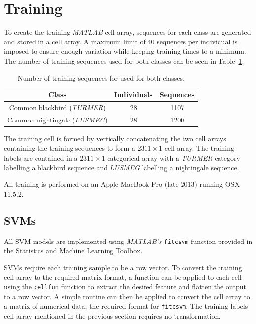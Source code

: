 \section{Training}\label{sec:training}

To create the training \textit{MATLAB} cell array, sequences for each class are
generated and stored in a cell array. A maximum limit of 40 sequences per
individual is imposed to ensure enough variation while keeping training times to
a minimum. The number of training sequences used for both classes can be seen in
Table~\ref{table:training_samples}.

\begin{table}[ht]
\begin{center}
\begin{tabular}{c c c}
\toprule
Class & Individuals & Sequences \\ [0.5ex]
\midrule
Common blackbird (\textit{TURMER}) & 28 & 1107 \\
Common nightingale (\textit{LUSMEG}) & 28 & 1200 \\
\bottomrule
\end{tabular}
\caption{Number of training sequences for used for both
classes.}\label{table:training_samples}
\end{center}
\end{table}

The training cell is formed by vertically concatenating the two cell arrays
containing the training sequences to form a $2311 \times 1$ cell array. The
training labels are contained in a $2311 \times 1$ categorical array with a
\textit{TURMER} category labelling a blackbird sequence and \textit{LUSMEG}
labelling a nightingale sequence.

All training is performed on an Apple MacBook Pro (late 2013) running OSX
11.5.2.

\subsection{SVMs}

All SVM models are implemented using \textit{MATLAB's} \texttt{fitcsvm}
function provided in the Statistics and Machine Learning Toolbox.

SVMs require each training sample to be a row vector. To convert the training
cell array to the required matrix format, a function can be applied to each cell
using the \texttt{cellfun} function to extract the desired feature and flatten
the output to a row vector. A simple routine can then be applied to convert the
cell array to a matrix of numerical data, the required format for
\texttt{fitcsvm}. The training labels cell array mentioned in the previous
section requires no transformation.

